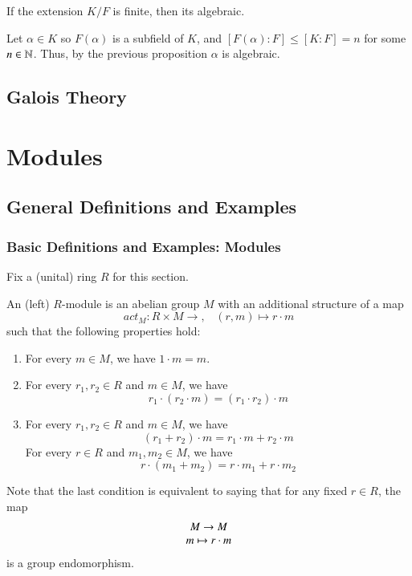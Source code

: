\documentclass[12pt, a4paper, twoside, openright, titlepage]{book}
\begin{document}
\begin{cor}{}{}
    If the extension $K/F$ is finite, then its algebraic.
\end{cor}
\begin{proof*}{}{}
    Let $\alpha \in K$ so $F(\alpha)$ is a subfield of $K$, and $[F(\alpha):F] \leq [K:F] = n$ for some $n \in \mathbb N$. Thus, by the previous proposition $\alpha$ is algebraic.
\end{proof*}




\chapter{\textsection\textsection Galois Theory}


\part{Modules}

\chapter{\textsection\textsection General Definitions and Examples}


\section{\textsection Basic Definitions and Examples: Modules}

Fix a (unital) ring $R$ for this section.

\begin{defn}{}{}
    An (left) $R$-module is an abelian group $M$ with an additional structure of a map \begin{equation}
        act_M:R\times M \rightarrow,\;\;\;(r,m)\mapsto r\cdot m
    \end{equation}
    such that the following properties hold:\begin{enumerate}
        \item For every $m \in M$, we have $1 \cdot m = m$.
        \item For every $r_1,r_2 \in R$ and $m \in M$, we have $$r_1\cdot(r_2\cdot m) = (r_1\cdot r_2)\cdot m$$
        \item For every $r_1,r_2 \in R$ and $m \in M$, we have $$(r_1+r_2)\cdot m = r_1\cdot m + r_2\cdot m$$
        For every $r \in R$ and $m_1,m_2 \in M$, we have $$r\cdot (m_1+m_2) = r\cdot m_1 + r\cdot m_2$$
    \end{enumerate}
    Note that the last condition is equivalent to saying that for any fixed $r \in R$, the map $$\begin{array}{c} M\rightarrow M \\ m\mapsto r\cdot m \end{array}$$
    is a group endomorphism.
\end{defn}
\end{document}

